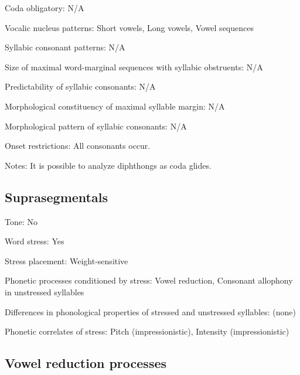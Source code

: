 {\begin{appendixdesc}
\item[Coda obligatory:] N/A

\item[Vocalic nucleus patterns:] Short vowels, Long vowels, Vowel sequences

\item[Syllabic consonant patterns:] N/A

\item[Size of maximal word-marginal sequences with syllabic obstruents:]  N/A

\item[Predictability of syllabic consonants:] N/A

\item[Morphological constituency of maximal syllable margin:] N/A

\item[Morphological pattern of syllabic consonants:] N/A

\item[Onset restrictions:] All consonants occur.

\item[Notes:] It is possible to analyze diphthongs as coda glides.
\end{appendixdesc}
\subsection*{Suprasegmentals}
\begin{appendixdesc}

\item[Tone:] No

\item[Word stress:] Yes

\item[Stress placement:] Weight-sensitive

\item[Phonetic processes conditioned by stress:] Vowel reduction, Consonant allophony in unstressed syllables

\item[Differences in phonological properties of stressed and unstressed syllables:] (none)

\item[Phonetic correlates of stress:] Pitch (impressionistic), Intensity (impressionistic)
\end{appendixdesc}
\subsection*{Vowel reduction processes}
\begin{appendixdesc}


\end{appendixdesc}}
